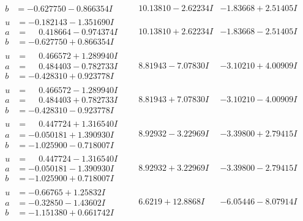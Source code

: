 \documentclass[1p]{elsarticle_modified}
\theoremstyle{definition}
\begin{document}
$$\begin{array}{c|c|c}
\begin{aligned}
b &= -0.627750 - 0.866354 I\end{aligned}
 & \phantom{-}10.13810 - 2.62234 I & -1.83668 + 2.51405 I \\ \hline\begin{aligned}
u &= -0.182143 - 1.351690 I \\
a &= \phantom{-}0.418664 - 0.974374 I \\
b &= -0.627750 + 0.866354 I\end{aligned}
 & \phantom{-}10.13810 + 2.62234 I & -1.83668 - 2.51405 I \\ \hline\begin{aligned}
u &= \phantom{-}0.466572 + 1.289940 I \\
a &= \phantom{-}0.484403 - 0.782733 I \\
b &= -0.428310 + 0.923778 I\end{aligned}
 & \phantom{-}8.81943 - 7.07830 I & -3.10210 + 4.00909 I \\ \hline\begin{aligned}
u &= \phantom{-}0.466572 - 1.289940 I \\
a &= \phantom{-}0.484403 + 0.782733 I \\
b &= -0.428310 - 0.923778 I\end{aligned}
 & \phantom{-}8.81943 + 7.07830 I & -3.10210 - 4.00909 I \\ \hline\begin{aligned}
u &= \phantom{-}0.447724 + 1.316540 I \\
a &= -0.050181 + 1.390930 I \\
b &= -1.025900 - 0.718007 I\end{aligned}
 & \phantom{-}8.92932 - 3.22969 I & -3.39800 + 2.79415 I \\ \hline\begin{aligned}
u &= \phantom{-}0.447724 - 1.316540 I \\
a &= -0.050181 - 1.390930 I \\
b &= -1.025900 + 0.718007 I\end{aligned}
 & \phantom{-}8.92932 + 3.22969 I & -3.39800 - 2.79415 I \\ \hline\begin{aligned}
u &= -0.66765 + 1.25832 I \\
a &= -0.32850 - 1.43602 I \\
b &= -1.151380 + 0.661742 I\end{aligned}
 & \phantom{-}6.6219 + 12.8868 I & -6.05446 - 8.07914 I \\ \hline\begin{aligned}

\end{aligned}
\end{array}$$
\end{document}
